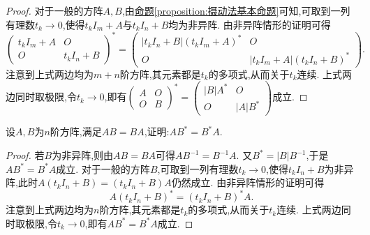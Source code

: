 \documentclass[../../main.tex]{subfiles}%
\begin{document}
\begin{proof}
对于一般的方阵\(A,B\),由\hyperref[proposition:摄动法基本命题]{命题\ref{proposition:摄动法基本命题}}可知,可取到一列有理数\(t_k\rightarrow0\),使得\(t_kI_m + A\)与\(t_kI_n + B\)均为非异阵. 由非异阵情形的证明可得
\[
\begin{pmatrix}
t_kI_m + A & O\\
O & t_kI_n + B
\end{pmatrix}^*=\begin{pmatrix}
|t_kI_n + B|(t_kI_m + A)^* & O\\
O & |t_kI_m + A|(t_kI_n + B)^*
\end{pmatrix}.
\]
注意到上式两边均为\(m + n\)阶方阵,其元素都是\(t_k\)的多项式,从而关于\(t_k\)连续. 上式两边同时取极限,令\(t_k\rightarrow0\),即有\(\begin{pmatrix}
A & O\\
O & B
\end{pmatrix}^*=\begin{pmatrix}
|B|A^* & O\\
O & |A|B^*
\end{pmatrix}\)成立.

\end{proof}

\begin{example}
设\(A,B\)为\(n\)阶方阵,满足\(AB = BA\),证明:\(AB^* = B^*A\).
\end{example}
\begin{proof}
若\(B\)为非异阵,则由\(AB = BA\)可得\(AB^{-1}=B^{-1}A\). 又\(B^* = |B|B^{-1}\),于是\(AB^* = B^*A\)成立. 对于一般的方阵\(B\),可取到一列有理数\(t_k\rightarrow0\),使得\(t_kI_n + B\)为非异阵,此时\(A(t_kI_n + B)=(t_kI_n + B)A\)仍然成立. 由非异阵情形的证明可得
\[
A(t_kI_n + B)^*=(t_kI_n + B)^*A.
\]
注意到上式两边均为\(n\)阶方阵,其元素都是\(t_k\)的多项式,从而关于\(t_k\)连续. 上式两边同时取极限,令\(t_k\rightarrow0\),即有\(AB^* = B^*A\)成立.
\end{proof}
\end{document}
